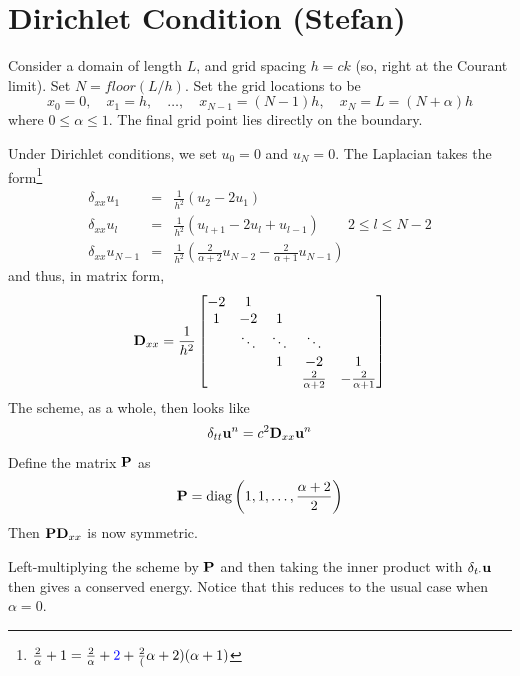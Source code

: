 \documentclass[dvipsnames]{article}
\def\SWcomment[#1]{\textcolor{blue}{#1}}
\begin{document}
\section{Dirichlet Condition (Stefan)}

Consider a domain of length $L$, and grid spacing $h = ck$ (so, right at the Courant limit). Set $N = floor(L/h)$. Set the grid locations to be
\begin{equation}
x_{0} = 0,\quad x_{1} = h,\quad\hdots,\quad x_{N-1} = (N-1)h, \quad x_{N} = L = (N+\alpha)h
\end{equation}
where $0\leq \alpha\leq 1$. The final grid point lies directly on the boundary. 

Under Dirichlet conditions, we set $u_{0} = 0$ and $u_{N} = 0$. The Laplacian takes the form\footnote{\SWcomment[$\frac{2}{\alpha+1} = \frac{2}{\alpha+\SWcomment[2]}+\frac{2}{(\alpha+2)(\alpha+1)}$]}
\begin{eqnarray}
    \delta_{xx}u_{1}&=& \frac{1}{h^2}\left(u_{2}-2u_{1}\right)\\
    \delta_{xx}u_{l} &=& \frac{1}{h^2}\left(u_{l+1}-2u_{l}+u_{l-1}\right)\qquad 2\leq l\leq N-2\\
    \delta_{xx}u_{N-1} &=& \frac{1}{h^2}\left(\frac{2}{\alpha+2}u_{N-2}-\frac{2}{\alpha+1}u_{N-1}\right)\label{eq:uNmin1}
\end{eqnarray}
and thus, in matrix form, 
\begin{equation}
{\bf D}_{xx} = \frac{1}{h^2} 
    \begin{bmatrix}
    -2 & 1 & & &\\
    1 & -2 & 1 & &\\
     & \ddots & \ddots & \ddots & \\
     && 1 & -2 & 1\\
     &&& \frac{2}{\alpha+2} & -\frac{2}{\alpha+1}\\
    \end{bmatrix}
\end{equation}
The scheme, as a whole, then looks like
\begin{equation}
    \delta_{tt}{\bf u}^{n} = c^2{\bf D}_{xx}{\bf u}^{n}
\end{equation}
Define the matrix ${\bf P}$ as
\begin{equation}
    {\bf P} = {\rm diag}\left(1,1,\hdots,\frac{\alpha+2}{2}\right)
\end{equation}
Then ${\bf P D}_{xx}$ is now symmetric. 

Left-multiplying the scheme by ${\bf P}$ and then taking the inner product with $\delta_{t\cdot}{\bf u}$ then gives a conserved energy. Notice that this reduces to the usual case when $\alpha = 0$. 
\end{document}

